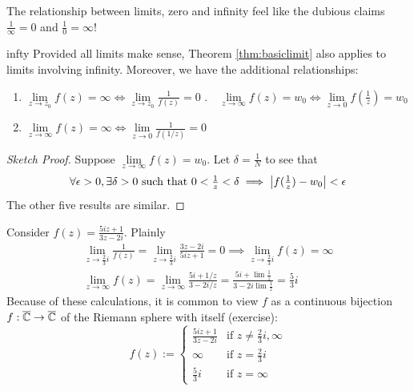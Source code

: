 The relationship between limits, zero and infinity feel like the dubious claims $\frac 1\infty=0$ and $\frac 10=\infty$!

\begin{thm}{}{infty}
	Provided all limits make sense, Theorem \ref{thm:basiclimit} also applies to limits involving infinity. Moreover, we have the additional relationships:
	\begin{enumerate}
	  \item $\lim\limits_{z\to z_0}f(z)=\infty \iff \lim\limits_{z\to z_0}\frac 1{f(z)}=0$ \qquad{}.\ \ $\lim\limits_{z\to\infty}f(z)=w_0 \iff \lim\limits_{z\to 0}f\left(\frac 1z\right)=w_0$
	  \setcounter{enumi}{2}
	  \item $\lim\limits_{z\to \infty}f(z)=\infty \iff \lim\limits_{z\to 0}\frac 1{f(1/z)}=0$
	\end{enumerate}
\end{thm}

\begin{proof}[Sketch Proof]
	Suppose $\lim\limits_{z\to\infty}f(z)=w_0$. Let $\delta=\frac 1N$ to see that
	\[
		\forall \epsilon>0,\exists \delta>0\text{ such that }0<\tfrac 1z<\delta \implies \left| f(\tfrac 1z)-w_0\right|<\epsilon
	\]
	The other five results are similar.
\end{proof}


\begin{example}{}{}
	Consider $f(z)=\frac{5iz+1}{3z-2i}$. Plainly 
  \begin{gather*}
  	\lim_{z\to\frac 23i}\frac 1{f(z)}=\lim_{z\to\frac 23i}\frac{3z-2i}{5iz+1}=0\implies \lim_{z\to\frac 23i}f(z)=\infty\\
  	\lim_{z\to\infty}f(z)= \lim_{z\to\infty}\frac{5i+1/z}{3-2i/z} = \frac{5i+\lim\frac 1z}{3-2i\lim\frac 1z}=\frac 53i
  \end{gather*}\goodbreak
Because of these calculations, it is common to view $f$ as a continuous bijection $f:\overline{\mathbb{C}}\to\overline{\mathbb{C}}$ of the Riemann sphere with itself (exercise):
\[
	f(z):=
	\begin{cases}
		\frac{5iz+1}{3z-2i}&\text{if }z\neq \frac 23i,\infty\\
		\infty&\text{if }z=\frac 23i\\
		\frac 53i&\text{if }z=\infty
	\end{cases}
\]
\end{example}

